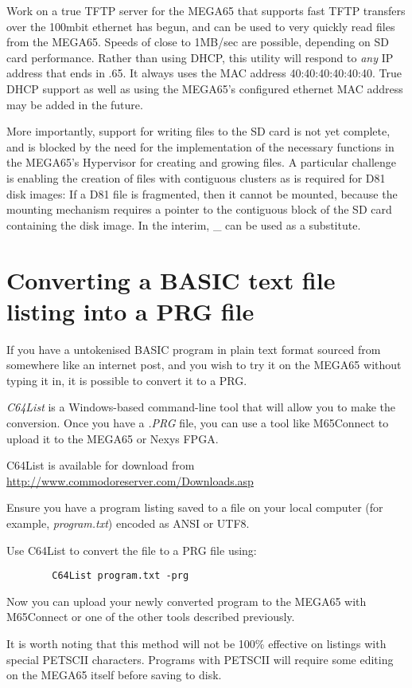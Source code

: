 Work on a true TFTP server for the MEGA65 that supports fast
TFTP transfers over the 100mbit ethernet has begun, and can be used to
very quickly read files from the MEGA65. Speeds of close to 1MB/sec
are possible, depending on SD card performance.  Rather than using
DHCP, this utility will respond to {\em any} IP address that ends in
.65. It always uses the MAC address 40:40:40:40:40:40. True DHCP
support as well as using the MEGA65's configured ethernet MAC address
may be added in the future. 

More importantly, support for writing
files to the SD card is not yet complete, and is blocked by the need
for the implementation of the necessary functions in the MEGA65's Hypervisor for creating and
growing files.  A particular challenge is enabling the creation of
files with contiguous clusters as is required for D81 disk images: If
a D81 file is fragmented, then it cannot be mounted, because the
mounting mechanism requires a pointer to the contiguous block of the
SD card containing the disk image.
In the interim, \_ can be used as a substitute.

\section{Converting a BASIC text file listing into a PRG file}

If you have a untokenised BASIC program in plain text format sourced from somewhere like an internet post, and you wish to try it on the MEGA65 without typing it in, it is possible to convert it to a PRG.

\textit{C64List} is a Windows-based command-line tool that will allow you to make the conversion. Once you have a \textit{.PRG} file, you can use a tool like M65Connect to upload it to the MEGA65 or Nexys FPGA. 

C64List is available for download from \url{http://www.commodoreserver.com/Downloads.asp}

Ensure you have a program listing saved to a file on your local computer (for example, \textit{program.txt}) encoded as ANSI or UTF8.

Use C64List to convert the file to a PRG file using:
    
\begin{tcolorbox}[colback=black,coltext=white]
    \begin{verbatim}
        C64List program.txt -prg
    \end{verbatim}
\end{tcolorbox}

Now you can upload your newly converted program to the MEGA65 with M65Connect or one of the other tools described previously.

It is worth noting that this method will not be 100\% effective on listings with special PETSCII characters. Programs with PETSCII will require some editing on the MEGA65 itself before saving to disk.

